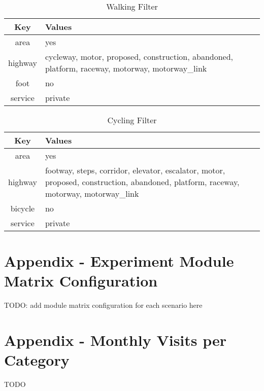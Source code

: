 \begin{table}[h]
\centering
\caption{Walking Filter}
\begin{tabular}{|c|p{10cm}|}
\hline
\textbf{Key}         & \textbf{Values}                                                                                                             \\ \hline
area                 & yes                                                                                                                         \\ \hline
highway              & cycleway, motor, proposed, construction, abandoned, platform, raceway, motorway, motorway\_link                             \\ \hline
foot                 & no                                                                                                                          \\ \hline
service              & private                                                                                                                     \\ \hline
\end{tabular}
\end{table}


\begin{table}[h]
\centering
\caption{Cycling Filter}
\begin{tabular}{|c|p{10cm}|}
\hline
\textbf{Key}         & \textbf{Values}                                                                                                             \\ \hline
area                 & yes                                                                                                                         \\ \hline
highway              & footway, steps, corridor, elevator, escalator, motor, proposed, construction, abandoned, platform, raceway, motorway, motorway\_link \\ \hline
bicycle              & no                                                                                                                          \\ \hline
service              & private                                                                                                                     \\ \hline
\end{tabular}
\end{table}

\section{Appendix - Experiment Module Matrix Configuration}
\label{app:experiment_module_matrix_configuration}

TODO: add module matrix configuration for each scenario here

\section{Appendix - Monthly Visits per Category}
\label{app:monthly_visits_per_category}

TODO
